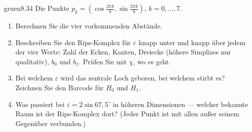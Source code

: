 \begin{karte}{gruen}{8.34}{\typwerk}{}
Die Punkte $p_k = (\cos\frac{2\pi k}8, \sin\frac{2\pi k}8)$, $k = 0, \dots, 7$.
\begin{enumerate}[label=(\alph*),leftmargin=1.6em,itemsep=2pt]
\item Berechnen Sie die vier vorkommenden Abstände.
\item Beschreiben Sie den Rips-Komplex für $\varepsilon$ knapp unter und knapp über jedem der vier Werte: Zahl der Ecken, Kanten, Dreiecke (höhere Simplizes nur qualitativ), $b_0$ und $b_1$. Prüfen Sie mit $\chi$, wo es geht.
\item Bei welchem $\varepsilon$ wird das zentrale Loch geboren, bei welchem stirbt es? Zeichnen Sie den Barcode für $H_0$ und $H_1$.
\item Was passiert bei $\varepsilon = 2\sin67{,}5^{\circ}$ in höheren Dimensionen --- welcher bekannte Raum ist der Rips-Komplex dort? (Jeder Punkt ist mit allen außer seinem Gegenüber verbunden.)
\end{enumerate}
\end{karte}
